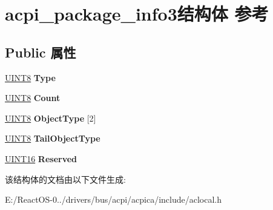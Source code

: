 \hypertarget{structacpi__package__info3}{}\section{acpi\+\_\+package\+\_\+info3结构体 参考}
\label{structacpi__package__info3}
\subsection*{Public 属性}
\begin{DoxyCompactItemize}
\item 
\mbox{\label{structacpi__package__info3_a82bada446e1478e07dca2038baad7a96}} 
\hyperlink{_processor_bind_8h_ab27e9918b538ce9d8ca692479b375b6a}{U\+I\+N\+T8} {\bfseries Type}
\item 
\mbox{\label{structacpi__package__info3_a60c2dfe5794374023e56c981fc374f76}} 
\hyperlink{_processor_bind_8h_ab27e9918b538ce9d8ca692479b375b6a}{U\+I\+N\+T8} {\bfseries Count}
\item 
\mbox{\label{structacpi__package__info3_a21fd8c5f3b1c02b4964d1d15736fcfc9}} 
\hyperlink{_processor_bind_8h_ab27e9918b538ce9d8ca692479b375b6a}{U\+I\+N\+T8} {\bfseries Object\+Type} \mbox{[}2\mbox{]}
\item 
\mbox{\label{structacpi__package__info3_a9a528323c0b8eb2ce0d7870c4e796396}} 
\hyperlink{_processor_bind_8h_ab27e9918b538ce9d8ca692479b375b6a}{U\+I\+N\+T8} {\bfseries Tail\+Object\+Type}
\item 
\mbox{\label{structacpi__package__info3_a96fd97e4cc7fbca9c500f7de58fa5a51}} 
\hyperlink{_processor_bind_8h_a09f1a1fb2293e33483cc8d44aefb1eb1}{U\+I\+N\+T16} {\bfseries Reserved}
\end{DoxyCompactItemize}


该结构体的文档由以下文件生成\+:\begin{DoxyCompactItemize}
\item 
E\+:/\+React\+O\+S-\/0../drivers/bus/acpi/acpica/include/aclocal.\+h\end{DoxyCompactItemize}

